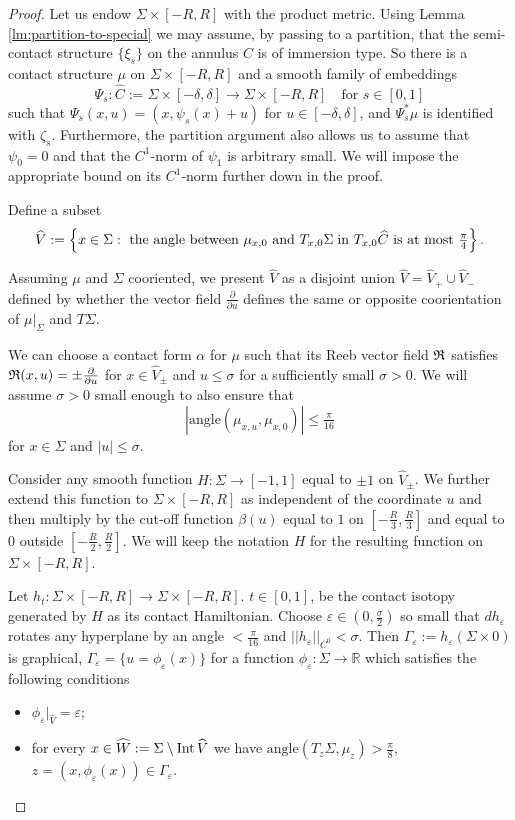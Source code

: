 \documentclass[12pt]{paper}
\theoremstyle{plain}
\theoremstyle{definition}
\newcommand{\wh}{\widehat}
\newcommand{\p}{\partial}
\newcommand{\eps}{\varepsilon}
\newcommand{\abs}[1]{\left| #1 \right|}
\newcommand{\R}{{\mathbb{R}}}
\newcommand{\Int}{{\rm Int\,}} %
\newcommand{\Reeb}{\frak{R}}
\numberwithin{figure}{section}
\begin{document}
\begin{proof}
 Let us endow $\Sigma\times[-R,R]$  with the product metric.
 Using  Lemma \ref{lm:partition-to-special}  we may assume,
 by passing to a partition, that the
 semi-contact structure $\{\xi_s\}$ on the annulus $C$ is of immersion type.  
 So there is a contact structure $\mu$ on $\Sigma\times[-R,R]$ and a 
    smooth family of 
    embeddings $$\Psi_s: \wh{C}:=\Sigma \times [-\delta, \delta] \to \Sigma\times[-R,R] \quad\mbox{for $s \in [0,1]$}$$ 
    such that $\Psi_s(x, u) = (x, \psi_s(x)+u)$ for $u\in[-\delta,\delta]$, and $\Psi_s^*\mu$ is identified with $\zeta_s$. Furthermore, the partition argument also allows us  to assume that $\psi_0=0$ and that the $C^1$-norm of $\psi_1$ is arbitrary small. We will impose the appropriate bound on its $C^1$-norm further down in the proof.
    
    
    Define  a   subset  
    \begin{align*}
	  \wh V&:=\left\{x\in\Sigma: \mbox{ the angle between } \mu_{x,0} \hbox{ and }  T_{x,0}\Sigma \;\hbox {in $T_{x,0}\wh{C}$ is
	at most } \tfrac\pi4\right\}.\\
\end{align*}
 

Assuming $\mu$ and $\Sigma$ cooriented, we present $\wh V$ as a
  disjoint union 
$\wh V=\wh V_+\cup \wh V_-$  defined by whether  the vector field $\frac{\p}{\p u}$ defines the same or opposite coorientation of   $\mu|_\Sigma $
and $T\Sigma$.

  
  We can choose  a contact form $\alpha$ for $\mu$  such that its Reeb vector field $\Reeb$  satisfies $\Reeb(x,u)=\pm\frac{\p}{\p u}$ for $x\in\wh V_\pm$ and $u\leq\sigma$ for a sufficiently small $\sigma>0$.
   We will assume  $\sigma>0$ small enough to also ensure  that 
 $$\abs{\mbox{angle}(\mu_{x,u},\mu_{x,0}) } \leq \tfrac{ \pi}{16}$$
 for $x\in\Sigma$ and $|u|\leq\sigma$.
 
  Consider any smooth function $H:\Sigma\to[-1,1]$  equal to $\pm 1$ on $\wh V_{\pm}$. We further extend this function to
 $\Sigma\times[-R,R]$ as   independent of the coordinate  $u$   and then multiply by the cut-off function $\beta(u)$ equal to $1$ on $[-\frac R3,\frac R3]$ and equal to $0$ outside $[-\frac R2,\frac R2]$. We will keep the notation $H$ for the resulting function on $\Sigma\times[-R,R]$.
  
 Let $h_t:\Sigma\times[-R,R]\to\Sigma\times[-R,R]$. $t\in[0,1]$, be the contact  isotopy generated by $H$ as its contact Hamiltonian.   Choose $\eps\in(0,\frac\sigma2)$  so small that 
 $dh_\eps$ rotates any hyperplane by an angle $<\frac\pi{16}$ and 
 $||h_\eps||_{C^0}<\sigma$.
 Then   $\Gamma_\eps:=h_\eps(\Sigma\times0)$ is graphical, $\Gamma_\eps=\{u=\phi_\eps(x)\}$ for a   function $\phi_\eps:\Sigma\to\R$ which satisfies the following conditions
 \begin{itemize}
 \item $\phi_\eps|_{\wh V}=\eps$;
 \item for every $x\in\wh  W:=\Sigma\setminus\Int \wh V$ we have
${\mathrm{angle}}(T_{z}\Sigma,\mu_z)>\frac\pi8$, $z=(x,\phi_\eps(x))\in\Gamma_\eps$.  \end{itemize}
 

\end{proof}
\end{document}
